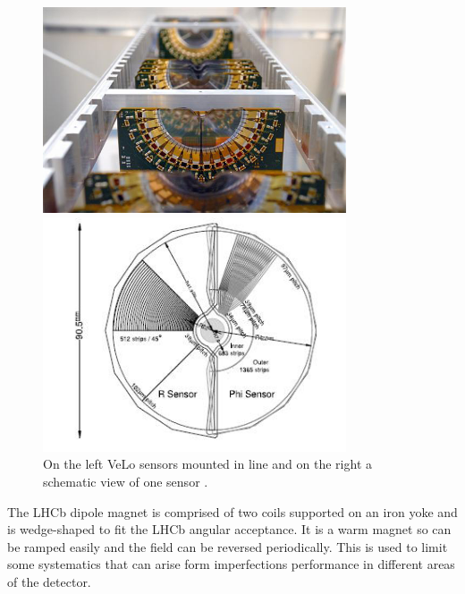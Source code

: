 \begin{center}
\begin{figure}[h!]
\label{VeLo}

\begin{minipage}{0.49\textwidth}

\centering \includegraphics[width=0.8\textwidth]{Detector/figs/detector/VELO.png}

\end{minipage}
\begin{minipage}{0.49\textwidth}

\centering \includegraphics[width=0.8\textwidth]{Detector/figs/detector/VELO_scheme.png}

\end{minipage}
\caption{On the left VeLo sensors mounted in line and on the right a schematic view of one sensor \cite{Alves:2008zz}.}
\end{figure}
\end{center}

The LHCb dipole magnet is comprised of two coils supported on an iron yoke and is wedge-shaped to fit the LHCb 
angular acceptance. It is a warm magnet so can be ramped easily and the field can be reversed periodically. 
This is used to limit some systematics that can arise form imperfections performance in different areas of the detector.

